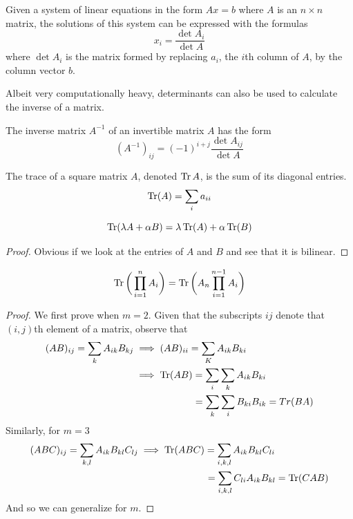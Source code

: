   \begin{theorem}
  Given a system of linear equations in the form $A x = b$ where $A$ is an $n \times n$ matrix, the solutions of this system can be expressed with the formulas 
  \[ x_i = \frac{ \det{A_i}}{\det{A}}\]
  where $\det{A_i}$ is the matrix formed by replacing $a_i$, the $i$th column of $A$, by the column vector $b$. 
  \end{theorem}

  Albeit very computationally heavy, determinants can also be used to calculate the inverse of a matrix. 

  \begin{theorem}
  The inverse matrix $A^{-1}$ of an invertible matrix $A$ has the form 
  \[(A^{-1})_{i j} = (-1)^{i+j} \frac{\det{A_{i j}}}{\det{A}}\]
  \end{theorem}

  \begin{definition}
  The trace of a square matrix $A$, denoted $\operatorname{Tr}{A}$, is the sum of its diagonal entries. 
  \[\operatorname{Tr}(A) = \sum_{i} a_{ii}\]
  \end{definition}

  \begin{proposition}
  \[\operatorname{Tr}(\lambda A + \alpha B) = \lambda \operatorname{Tr}(A) + \alpha \operatorname{Tr}(B)\]
  \end{proposition}
  \begin{proof}
  Obvious if we look at the entries of $A$ and $B$ and see that it is bilinear.
  \end{proof}

  \begin{theorem}
  \[\operatorname{Tr}{\bigg(\prod_{i=1}^n A_i\bigg)} = \operatorname{Tr}{\bigg(A_n \prod_{i=1}^{n-1} A_i\bigg)}\]
  \end{theorem}
  \begin{proof}
  We first prove when $m=2$. Given that the subscripts $i j$ denote that $(i,j)$th element of a matrix, observe that
  \begin{align*}
      (AB)_{ij} = \sum_{k} A_{ik} B_{kj} & \implies (AB)_{ii} = \sum_{K} A_{ik} B_{ki} \\
      & \implies \operatorname{Tr}(AB) = \sum_{i} \sum_{k} A_{ik} B_{ki} \\
      & \;\;\;\;\;\;\;\;\;\;\;\;\;\;\;\;\;\;\;\;\;\;= \sum_{k} \sum_{i} B_{ki} B_{ik} = Tr(BA)
  \end{align*}
  Similarly, for $m=3$
  \begin{align*}
      (ABC)_{ij} = \sum_{k,l} A_{ik} B_{kl} C_{lj} & \implies \operatorname{Tr}(ABC) = \sum_{i,k,l} A_{ik} B_{kl} C_{li} \\ 
      & \;\;\;\;\;\;\;\;\;\;\;\;\;\;\;\;\;\;\;\;\;\;\;\;\;= \sum_{i,k,l} C_{li} A_{ik} B_{kl} = \operatorname{Tr}(CAB)
  \end{align*}
  And so we can generalize for $m$. 
  \end{proof}

